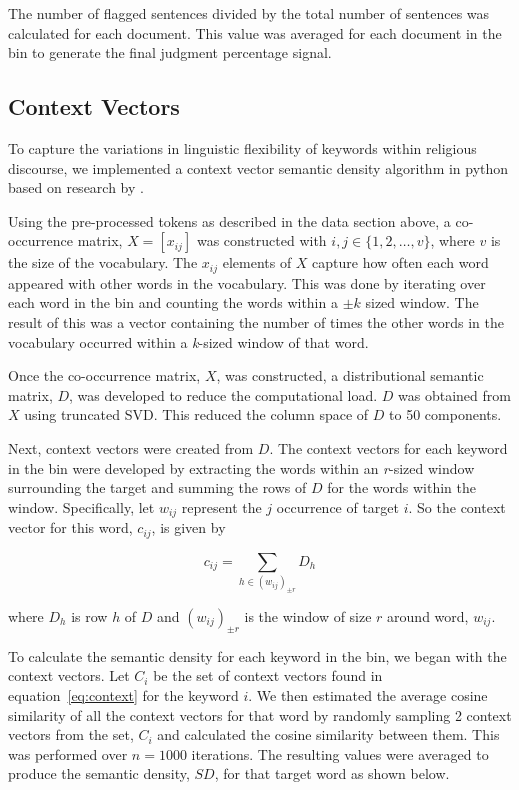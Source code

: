 \documentclass[11pt, a4paper]{article}
\begin{document}
The number of flagged sentences divided by the total number of sentences was calculated for each document. This value was averaged for each document in the bin to generate the final judgment percentage signal.

\subsection{Context Vectors}
\label{subsect:contextvectors}

To capture the variations in linguistic flexibility of keywords within religious discourse, we implemented a context vector semantic density algorithm in python based on research by . 

Using the pre-processed tokens as described in the data section above, a co-occurrence matrix, $X = [x_{ij}]$ was constructed with $i,j \in \{1,2,\ldots, v\}$, where $v$ is the size of the vocabulary. The $x_{ij}$ elements of $X$ capture how often each word appeared with other words in the vocabulary. This was done by iterating over each word in the bin and counting the words within a $\pm k$ sized window. The result of this was a vector containing the number of times the other words in the vocabulary occurred within a \textit{k}-sized window of that word.  

Once the co-occurrence matrix, $X$, was constructed, a distributional semantic matrix, $D$, was developed to reduce the computational load. $D$ was obtained from $X$ using truncated SVD. This reduced the column space of $D$ to 50 components. 

Next, context vectors were created from $D$. The context vectors for each keyword in the bin were developed by extracting the words within an \textit{r}-sized window surrounding the target and summing the rows of $D$ for the words within the window.  Specifically, let $w_{ij}$ represent the $j$ occurrence of target $i$. So the context vector for this word, $c_{ij}$, is given by 

\begin{equation}
\label{eq:context}
c_{ij}=\sum_{h \in (w_{ij})_{\pm r}} D_{h}
\end{equation}

\noindent where $D_{h}$ is  row $h$ of $D$ and $(w_{ij})_{\pm r}$ is the window of size $r$ around word, $w_{ij}$. 

To calculate the semantic density for each keyword in the bin, we began with the context vectors. Let $C_{i}$ be the set of context vectors found in equation~\ref{eq:context} for the keyword $i$. We then estimated the average cosine similarity of all the context vectors for that word by randomly sampling 2 context vectors from the set, $C_{i}$ and calculated the cosine similarity between them. This was performed over $n=1000$ iterations. The resulting values were averaged to produce the semantic density, $SD$, for that target word as shown below.
\end{document}
